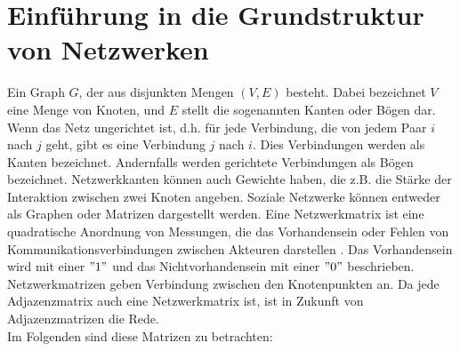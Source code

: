 \section{Einführung in die Grundstruktur von Netzwerken}
Ein Graph $G$, der aus disjunkten Mengen $(V ,E)$ besteht. Dabei bezeichnet $V$ eine Menge von Knoten, und $E$ stellt die sogenannten Kanten oder Bögen dar.\\
Wenn das Netz ungerichtet ist, d.h. für jede Verbindung, die von jedem Paar $i$ nach $j$ geht, gibt es eine Verbindung $j$ nach $i$. Dies Verbindungen werden als Kanten bezeichnet. Andernfalls werden gerichtete Verbindungen
als Bögen bezeichnet. Netzwerkkanten können auch Gewichte haben, die z.B. die Stärke der Interaktion zwischen zwei Knoten angeben.
Soziale Netzwerke können entweder als Graphen oder Matrizen dargestellt werden. Eine Netzwerkmatrix ist eine quadratische Anordnung von Messungen, die das Vorhandensein oder Fehlen von Kommunikationsverbindungen zwischen Akteuren darstellen \cite{Hanneman}. Das Vorhandensein wird mit einer $"1"$ und das Nichtvorhandensein mit einer $"0"$ beschrieben. Netzwerkmatrizen geben Verbindung zwischen den Knotenpunkten an. Da jede Adjazenzmatrix auch eine Netzwerkmatrix ist, ist in Zukunft von Adjazenzmatrizen die Rede. \\
Im Folgenden sind diese Matrizen zu betrachten: \\
 
